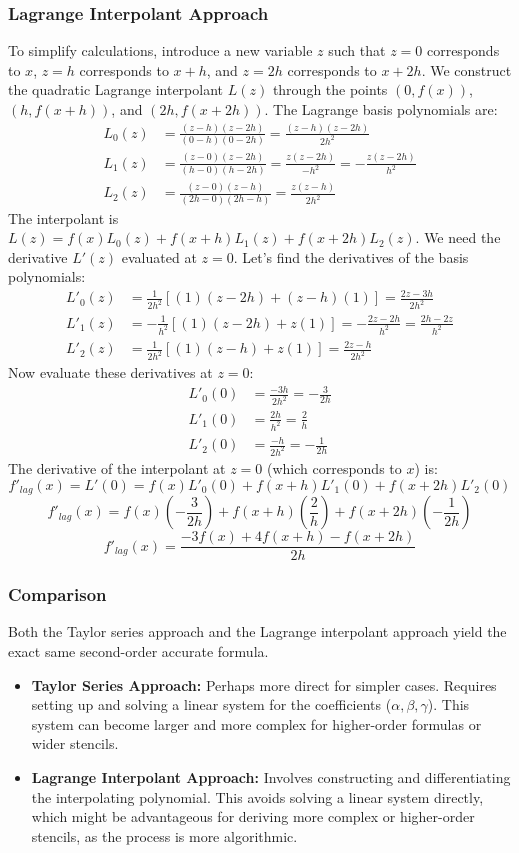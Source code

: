 \documentclass{article}
\begin{document}
\subsubsection{Lagrange Interpolant Approach}
To simplify calculations, introduce a new variable $z$ such that $z=0$ corresponds to $x$, $z=h$ corresponds to $x+h$, and $z=2h$ corresponds to $x+2h$. We construct the quadratic Lagrange interpolant $L(z)$ through the points $(0, f(x))$, $(h, f(x+h))$, and $(2h, f(x+2h))$.
The Lagrange basis polynomials are:
\begin{align*} L_0(z) &= \frac{(z-h)(z-2h)}{(0-h)(0-2h)} = \frac{(z-h)(z-2h)}{2h^2} \\ L_1(z) &= \frac{(z-0)(z-2h)}{(h-0)(h-2h)} = \frac{z(z-2h)}{-h^2} = -\frac{z(z-2h)}{h^2} \\ L_2(z) &= \frac{(z-0)(z-h)}{(2h-0)(2h-h)} = \frac{z(z-h)}{2h^2} \end{align*}
The interpolant is $L(z) = f(x) L_0(z) + f(x+h) L_1(z) + f(x+2h) L_2(z)$.
We need the derivative $L'(z)$ evaluated at $z=0$. Let's find the derivatives of the basis polynomials:
\begin{align*} L'_0(z) &= \frac{1}{2h^2} [(1)(z-2h) + (z-h)(1)] = \frac{2z - 3h}{2h^2} \\ L'_1(z) &= -\frac{1}{h^2} [(1)(z-2h) + z(1)] = -\frac{2z - 2h}{h^2} = \frac{2h - 2z}{h^2} \\ L'_2(z) &= \frac{1}{2h^2} [(1)(z-h) + z(1)] = \frac{2z - h}{2h^2} \end{align*}
Now evaluate these derivatives at $z=0$:
\begin{align*} L'_0(0) &= \frac{-3h}{2h^2} = -\frac{3}{2h} \\ L'_1(0) &= \frac{2h}{h^2} = \frac{2}{h} \\ L'_2(0) &= \frac{-h}{2h^2} = -\frac{1}{2h} \end{align*}
The derivative of the interpolant at $z=0$ (which corresponds to $x$) is:
\[
f'_{lag}(x) = L'(0) = f(x) L'_0(0) + f(x+h) L'_1(0) + f(x+2h) L'_2(0)
\]
\[
f'_{lag}(x) = f(x) \left(-\frac{3}{2h}\right) + f(x+h) \left(\frac{2}{h}\right) + f(x+2h) \left(-\frac{1}{2h}\right)
\]
\[
f'_{lag}(x) = \frac{-3f(x) + 4f(x+h) - f(x+2h)}{2h}
\]

\subsubsection{Comparison}
Both the Taylor series approach and the Lagrange interpolant approach yield the exact same second-order accurate formula.
\begin{itemize}
    \item \textbf{Taylor Series Approach:} Perhaps more direct for simpler cases. Requires setting up and solving a linear system for the coefficients ($\alpha, \beta, \gamma$). This system can become larger and more complex for higher-order formulas or wider stencils.
    \item \textbf{Lagrange Interpolant Approach:} Involves constructing and differentiating the interpolating polynomial. This avoids solving a linear system directly, which might be advantageous for deriving more complex or higher-order stencils, as the process is more algorithmic.
\end{itemize}
\end{document}

